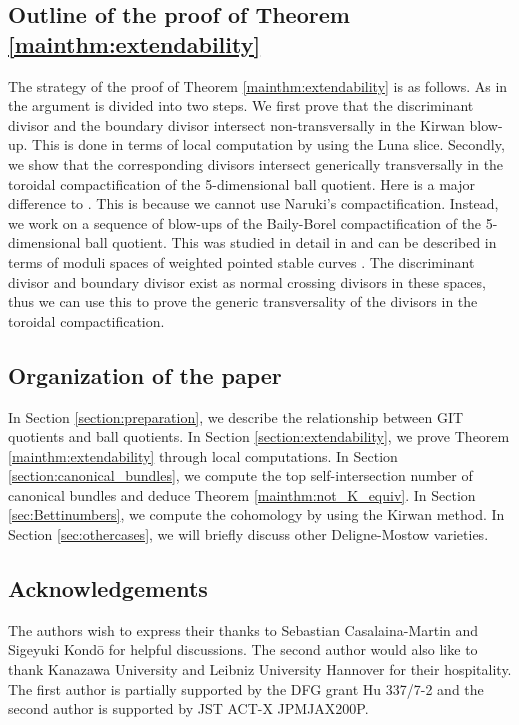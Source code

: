 \documentclass[12pt, pdftex]{amsart}
\theoremstyle{plain}
\theoremstyle{definition}
\numberwithin{equation}{section}
\begin{document}
\subsection{Outline of the proof of Theorem \ref{mainthm:extendability}}
The strategy of the proof of Theorem \ref{mainthm:extendability} is as follows.
As in \cite{CMGHL22} the argument is divided into two steps.
We first prove that the discriminant divisor and the boundary divisor intersect non-transversally in the Kirwan blow-up.
This is done in terms of local computation by using the Luna slice. Secondly, we show that the corresponding divisors intersect generically transversally in the toroidal compactification of  the 5-dimensional ball quotient.
Here is a major difference to \cite{CMGHL22}.
This is because we cannot use Naruki's compactification.
Instead, we work on a  sequence of blow-ups of the Baily-Borel compactification of the 5-dimensional ball quotient.
This was studied in detail in \cite{GKS21, KM11} and can be described in terms of moduli spaces of weighted pointed stable curves \cite{Ha03}.
The discriminant divisor and boundary divisor exist as normal crossing divisors in these spaces, thus we can use this to prove the generic transversality of the divisors in the toroidal compactification.


\subsection{Organization of the paper}
In Section \ref{section:preparation}, we describe the relationship between GIT quotients and ball quotients.
In Section \ref{section:extendability}, we prove Theorem \ref{mainthm:extendability} through local computations.
In Section \ref{section:canonical_bundles}, we compute the top self-intersection number of canonical bundles and deduce Theorem \ref{mainthm:not_K_equiv}.
In Section \ref{sec:Bettinumbers}, we compute the cohomology by using the Kirwan method.
In Section \ref{sec:othercases}, we will briefly discuss other Deligne-Mostow varieties. 



\subsection*{Acknowledgements}
The authors wish to express their thanks to Sebastian  Casalaina-Martin and Sigeyuki Kond\={o} for helpful discussions.
The second author would also like to thank Kanazawa University and Leibniz University Hannover for their hospitality.
The first author is partially supported by the DFG grant Hu 337/7-2 and the second author is supported by JST ACT-X JPMJAX200P.
\end{document}

